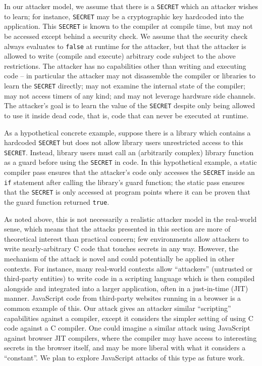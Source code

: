 In our attacker model, we assume that there is a \verb|SECRET| which an
attacker wishes to learn; for instance, \verb|SECRET| may be a cryptographic
key hardcoded into the application.
This \verb|SECRET| is known to the compiler at compile time, but may not be
accessed except behind a security check.
We assume that the security check always evaluates to \verb|false| at runtime
for the attacker, but that the attacker is allowed to write (compile and
execute) arbitrary code subject to the above restrictions.
The attacker has no capabilities other than writing and executing code -- in
particular the attacker may not disassemble the compiler or libraries to learn
the \verb|SECRET| directly; may not examine the internal state of the compiler;
may not access timers of any kind; and may not leverage hardware side channels.
The attacker's goal is to learn the value of the \verb|SECRET| despite only
being allowed to use it inside dead code, that is, code that can never be
executed at runtime.

As a hypothetical concrete example, suppose there is a library which contains
a hardcoded \verb|SECRET| but does not allow library users unrestricted access
to this \verb|SECRET|.
Instead, library users must call an (arbitrarily complex) library function as
a guard before using the \verb|SECRET| in code.
In this hypothetical example, a static compiler pass ensures that the
attacker's code only accesses the \verb|SECRET| inside an \verb|if| statement
after calling the library's guard function; the static pass ensures that
the \verb|SECRET| is only accessed at program points where it can be proven
that the guard function returned \verb|true|.

As noted above, this is not necessarily a realistic attacker model in the
real-world sense, which means that the attacks presented in this section
are more of theoretical interest than practical concern; few environments
allow attackers to write nearly-arbitrary C code that touches secrets in any
way.
However, the mechanism of the attack is novel and could potentially be applied
in other contexts.
For instance, many real-world contexts allow ``attackers'' (untrusted or
third-party entities) to write code in a scripting language which is then
compiled alongside and integrated into a larger application, often in a
just-in-time (JIT) manner.
JavaScript code from third-party websites running in a browser is a common
example of this.
Our attack gives an attacker similar ``scripting'' capabilities against a
compiler, except it considers the simpler setting of using C code against a C
compiler.
One could imagine a similar attack using JavaScript against browser JIT
compilers, where the compiler may have access to interesting secrets in the
browser itself, and may be more liberal with what it considers a ``constant''.
We plan to explore JavaScript attacks of this type as future work.

